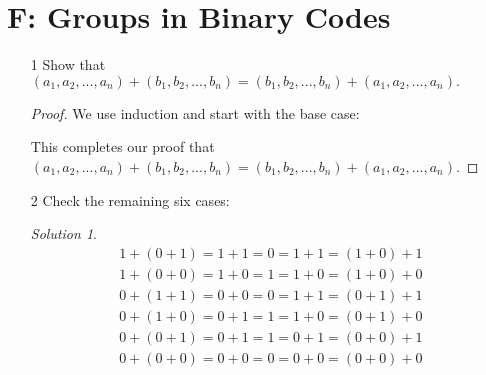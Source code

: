 \documentclass[11pt, b5paper, draft, fleqn]{book}
\theoremstyle{remark}
\newtheorem*{solution}{Solution}
\theoremstyle{plain}
\begin{document}
\section*{F: Groups in Binary Codes}
\begin{enumerate}
	\item[1] Show that \((a_1, a_2, ..., a_n) + (b_1, b_2, ..., b_n) = (b_1, b_2, ..., b_n) + (a_1, a_2, ..., a_n).\)
	\begin{proof}
		We use induction and start with the base case:
		This completes our proof that \((a_1, a_2, ..., a_n) + (b_1, b_2, ..., b_n) = (b_1, b_2, ..., b_n) + (a_1, a_2, ..., a_n)\).
	\end{proof}
	
	\item[2] Check the remaining six cases:
	\begin{solution}
	\begin{align*}
		1 + (0 + 1) = 1 + 1 = 0 = 1 + 1 = (1 + 0) + 1 \\
		1 + (0 + 0) = 1 + 0 = 1 = 1 + 0 = (1 + 0) + 0 \\
		0 + (1 + 1) = 0 + 0 = 0 = 1 + 1 = (0 + 1) + 1 \\
		0 + (1 + 0) = 0 + 1 = 1 = 1 + 0 = (0 + 1) + 0 \\
		0 + (0 + 1) = 0 + 1 = 1 = 0 + 1 = (0 + 0) + 1 \\
		0 + (0 + 0) = 0 + 0 = 0 = 0 + 0 = (0 + 0) + 0
	\end{align*}
	\end{solution}
	

\end{enumerate}
\end{document}
